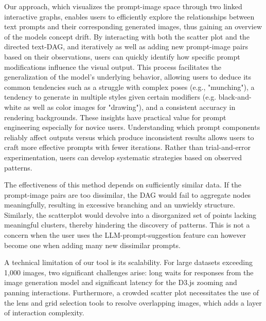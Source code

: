 \documentclass[
  a4paper,  %
  twoside,  %
  bibliography=totoc,
  headsepline,
  cleardoublepage=empty,
  parskip=half,
  draft=false
]{scrbook}
\begin{document}
Our approach, which visualizes the prompt-image space through two linked interactive graphs, enables users to efficiently explore the relationships between text prompts and their corresponding generated images, thus gaining an overview of the models concept drift. By interacting with both the scatter plot and the directed text-DAG, and iteratively as well as adding new prompt-image pairs based on their observations, users can quickly identify how specific prompt modifications influence the visual output. This process facilitates the generalization of the model's underlying behavior, allowing users to deduce its common tendencies such as a struggle with complex poses (e.g., "munching"), a tendency to generate in multiple styles given certain modifiers (e.g. black-and-white as well as color images for "drawing"), and a consistent accuracy in rendering backgrounds. These insights have practical value for prompt engineering especially for novice users. Understanding which prompt components reliably affect outputs versus which produce inconsistent results allows users to craft more effective prompts with fewer iterations. Rather than trial-and-error experimentation, users can develop systematic strategies based on observed patterns.

The effectiveness of this method depends on sufficiently similar data. If the prompt-image pairs are too dissimilar, the DAG would fail to aggregate nodes meaningfully, resulting in excessive branching and an unwieldy structure. Similarly, the scatterplot would devolve into a disorganized set of points lacking meaningful clusters, thereby hindering the discovery of patterns. This is not a concern when the user uses the LLM-prompt-suggestion feature can however become one when adding many new dissimilar prompts.

A technical limitation of our tool is its scalability. For large datasets exceeding 1,000 images, two significant challenges arise: long waits for responses from the image generation model and significant latency for the D3.js zooming and panning interactions. Furthermore, a crowded scatter plot necessitates the use of the lens and grid selection tools to resolve overlapping images, which adds a layer of interaction complexity.
\end{document}
